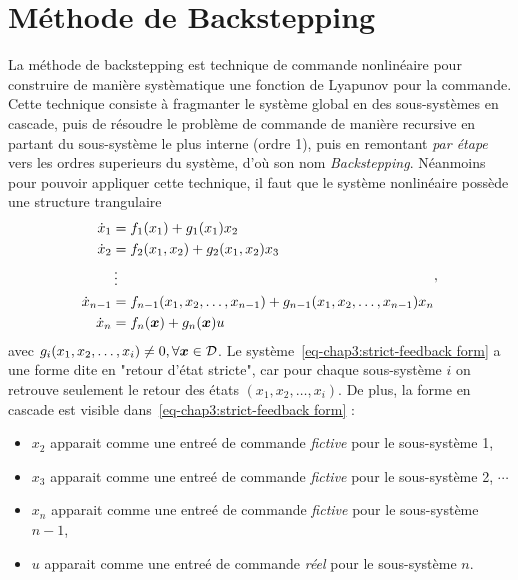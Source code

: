\section{Méthode de Backstepping}
La méthode de backstepping est technique de commande nonlinéaire pour construire de manière systèmatique une fonction de Lyapunov pour la commande. Cette technique consiste à fragmanter le système  global en des sous-systèmes en cascade, puis de résoudre le problème de commande de manière recursive en partant du sous-système le plus interne (ordre 1), puis en remontant \emph{par étape} vers les ordres superieurs du système, d'où son nom \emph{Backstepping}. Néanmoins pour pouvoir appliquer cette technique, il faut que  le système nonlinéaire possède une structure trangulaire
\begin{align}\label{eq-chap3:strict-feedback form}
	\begin{split}
		\dot{x}_1 &= f_1(x_1) + g_1(x_1)x_2\\
		\dot{x}_2 &= f_2(x_1,x_2) + g_2(x_1,x_2)x_3\\
		&\vdots \\
		\dot{x}_{n-1} &= f_{n-1}(x_1,x_2,\ldots,x_{n-1}) +  g_{n-1}(x_1,x_2,\ldots,x_{n-1})x_n\\
		\dot{x}_n &= f_{n}(\bm{x}) +  g_{n}(\bm{x})u
	\end{split},
\end{align} 
avec $g_i(x_1,x_2,\ldots,x_i)\neq0, \forall \bm{x}\in{\cal D}$. Le système~\eqref{eq-chap3:strict-feedback form} a une forme dite en "retour d'état stricte", car pour chaque sous-système $i$ on retrouve seulement le retour des états $(x_1,x_2,\ldots,x_i)$. De plus,  la forme en cascade est visible dans~\eqref{eq-chap3:strict-feedback form} : 
\begin{itemize}
	\item $x_2$ apparait comme une entreé de commande \emph{fictive} pour le sous-système 1,
	\item $x_3$ apparait comme une entreé de commande \emph{fictive} pour le sous-système 2, $\cdots$
	\item  $x_n$ apparait comme une entreé de commande \emph{fictive} pour le sous-système $n-1$, 
	\item  $u$ apparait comme une entreé de commande \emph{réel} pour le sous-système $n$.
\end{itemize}

